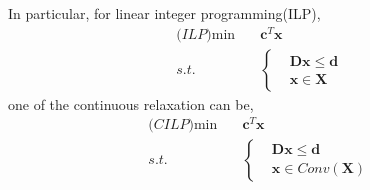 \documentclass{article}
\begin{document}
In particular, for linear integer programming(ILP),
\begin{align}
	\textit{(ILP)} \min \quad & \bm{c}^T\bm{x} \\
	 s.t. \quad & \left\{ 
	\begin{aligned}
	& \bm{D}\bm{x} \leq \bm{d} \\
	& \bm{x} \in \bm{X}
	\end{aligned} \right.
\end{align}
one of the continuous relaxation can be,
\begin{align}
	\textit{(CILP)} \min \quad & \bm{c}^T\bm{x} \\
	s.t. \quad & \left\{ 
	\begin{aligned}
	& \bm{D}\bm{x} \leq \bm{d} \\
	& \bm{x} \in Conv(\bm{X})
	\end{aligned} \right.
\end{align}
\end{document}
